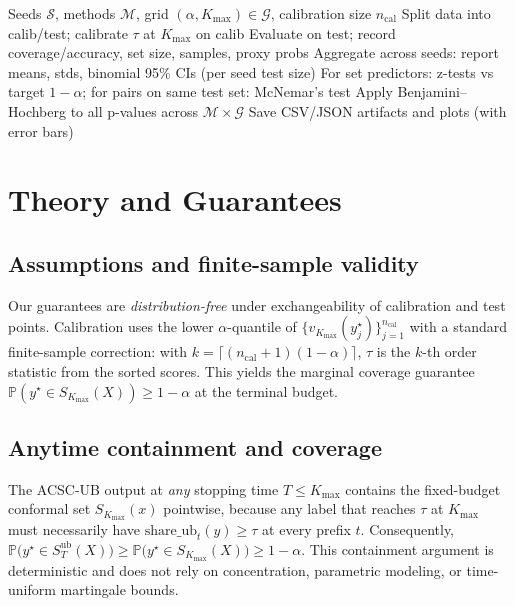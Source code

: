 \documentclass[11pt]{article}
\begin{document}
\vspace{0.5em}
\begin{algorithm}[htbp]
\caption{Evaluation Protocol (Multi-seed, CIs, BH-Adjusted Tests)}
\label{alg:eval}
\begin{algorithmic}[1]
\Require Seeds $\mathcal{S}$, methods $\mathcal{M}$, grid $(\alpha, K_{\max})\in \mathcal{G}$, calibration size $n_{\mathrm{cal}}$
    \State Split data into calib/test; calibrate $\tau$ at $K_{\max}$ on calib
      \State Evaluate on test; record coverage/accuracy, set size, samples, proxy probs
    \EndFor
  \EndFor
  \State Aggregate across seeds: report means, stds, binomial 95\% CIs (per seed test size)
  \State For set predictors: z-tests vs target $1-\alpha$; for pairs on same test set: McNemar's test
  \State Apply Benjamini--Hochberg to all p-values across $\mathcal{M}\times \mathcal{G}$
\EndFor
\State Save CSV/JSON artifacts and plots (with error bars)
\end{algorithmic}
\end{algorithm}
\vspace{0.5em}

\section{Theory and Guarantees}
\label{sec:theory}
\subsection{Assumptions and finite-sample validity}
Our guarantees are \emph{distribution-free} under exchangeability of calibration and test points. Calibration uses the lower $\alpha$-quantile of $\{v_{K_{\max}}(y_j^\star)\}_{j=1}^{n_{\mathrm{cal}}}$ with a standard finite-sample correction: with $k=\lceil (n_{\mathrm{cal}}+1)(1-\alpha)\rceil$, $\tau$ is the $k$-th order statistic from the sorted scores. This yields the marginal coverage guarantee $\mathbb{P}(y^\star\in S_{K_{\max}}(X))\ge 1-\alpha$ at the terminal budget.

\subsection{Anytime containment and coverage}
The ACSC-UB output at \emph{any} stopping time $T\le K_{\max}$ contains the fixed-budget conformal set $S_{K_{\max}}(x)$ pointwise, because any label that reaches $\tau$ at $K_{\max}$ must necessarily have $\text{share\_ub}_t(y)\ge \tau$ at every prefix $t$. Consequently,
$\mathbb{P}\big(y^\star \in S_T^{\text{ub}}(X)\big)\ge \mathbb{P}\big(y^\star \in S_{K_{\max}}(X)\big)\ge 1-\alpha$.
This containment argument is deterministic and does not rely on concentration, parametric modeling, or time-uniform martingale bounds.
\end{document}
